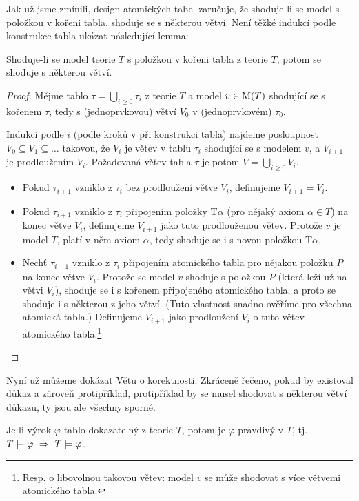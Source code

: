 Jak už jsme zmínili, design atomických tabel zaručuje, že shoduje-li se model s položkou v kořeni tabla, shoduje se s některou větví. Není těžké indukcí podle konstrukce tabla ukázat následující lemma:
\begin{lemma}\label{lemma:agrees-with-branch}
    Shoduje-li se model teorie $T$ s položkou v kořeni tabla z teorie $T$, potom se shoduje s některou větví.
\end{lemma}
\begin{proof}
    Mějme tablo $\tau=\bigcup_{i\geq 0}\tau_i$ z teorie $T$ a model $v\in\operatorname{M}(T)$ shodující se s kořenem $\tau$, tedy s (jednoprvkovou) větví $V_0$ v (jednoprvkovém) $\tau_0$.

    Indukcí podle $i$ (podle kroků v při konstrukci tabla) najdeme posloupnost $V_0\subseteq V_1\subseteq\dots$ takovou, že $V_i$ je větev v tablu $\tau_i$ shodující se s modelem $v$, a $V_{i+1}$ je prodloužením $V_i$. Požadovaná větev tabla $\tau$ je potom $V=\bigcup_{i\geq 0}V_i$.

    \begin{itemize}
        \item Pokud $\tau_{i+1}$ vzniklo z $\tau_i$ bez prodloužení větve $V_i$, definujeme $V_{i+1}=V_i$.
        \item Pokud $\tau_{i+1}$ vzniklo z $\tau_i$ připojením položky $\mathrm{T}\alpha$ (pro nějaký axiom $\alpha\in T$) na konec větve  $V_i$, definujeme $V_{i+1}$ jako tuto prodlouženou větev. Protože $v$ je model $T$, platí v něm axiom $\alpha$, tedy shoduje se i s novou položkou $\mathrm{T}\alpha$.
        \item Nechť $\tau_{i+1}$ vzniklo z $\tau_i$ připojením atomického tabla pro nějakou položku $P$ na konec větve $V_i$. Protože se model $v$ shoduje s položkou $P$ (která leží už na větvi $V_i$), shoduje se i s kořenem připojeného atomického tabla, a proto se shoduje i s některou z jeho větví. (Tuto vlastnost snadno ověříme pro všechna atomická tabla.) Definujeme $V_{i+1}$ jako prodloužení $V_i$ o tuto větev atomického tabla.\footnote{Resp. o libovolnou takovou větev: model $v$ se může shodovat s více větvemi atomického tabla.}
    \end{itemize}
\end{proof}

Nyní už můžeme dokázat Větu o korektnosti. Zkráceně řečeno, pokud by existoval důkaz a zároveň protipříklad, protipříklad by se musel shodovat s některou větví důkazu, ty jsou ale všechny sporné.

\begin{theorem}[O korektnosti]
Je-li výrok $\varphi$ tablo dokazatelný z teorie $T$, potom je $\varphi$ pravdivý v $T$, tj. $T\proves\varphi\ \Rightarrow\ T\models\varphi$.
\end{theorem}

